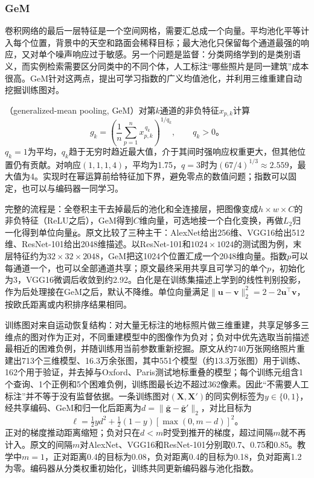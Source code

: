 \subsubsection{GeM}
\label{sec:vision-recognition-gem}

卷积网络的最后一层特征是一个空间网格，需要汇总成一个向量。平均池化平等计入每个位置，背景中的天空和路面会稀释目标；最大池化只保留每个通道最强的响应，又对单个噪声响应过于敏感。另一个问题是监督：分类网络学到的是类别语义，而实例检索需要区分同类中的不同个体，人工标注“哪些照片是同一建筑”成本很高。GeM针对这两点，提出可学习指数的广义均值池化，并利用三维重建自动挖掘训练图对。

（generalized-mean pooling, GeM）对第$k$通道的非负特征$x_{p,k}$计算
\begin{equation}
 g_k=\left(\frac1n\sum_{p=1}^{n}x_{p,k}^{\,q_k}\right)^{1/q_k},
 \qquad q_k>0\text{。}
 \label{eq:vision-gem}
\end{equation}
$q_k=1$为平均，$q_k$趋于无穷时趋近最大值，介于其间时强响应权重更大，但其他位置仍有贡献。对响应$(1,1,1,4)$，平均为1.75，$q=3$时为$(67/4)^{1/3}\approx2.559$，最大值为4。实现时在幂运算前给特征加下界，避免零点的数值问题；指数可以固定，也可以与编码器一同学习。

完整的流程是：全卷积主干去掉最后的池化和全连接层，把图像变成$h\times w\times C$的非负特征（ReLU之后），GeM得到$C$维向量，可选地接一个白化变换，再做$L_2$归一化得到单位向量$\bar{\bm g}$。原文比较了三种主干：AlexNet给出256维、VGG16给出512维、ResNet-101给出2048维描述。以ResNet-101和$1024\times1024$的测试图为例，末层特征约为$32\times32\times2048$，GeM把这1024个位置汇成一个2048维向量。指数$p$可以每通道一个，也可以全部通道共享；原文最终采用共享且可学习的单个$p$，初始化为3，VGG16微调后收敛到约2.92。白化是在训练集描述上学到的线性判别投影，作为后处理接在GeM之后，默认不降维。单位向量满足$\lVert\bm{u}-\bm{v}\rVert_2^2=2-2\bm{u}^{\top}\bm{v}$，按欧氏距离或内积排序结果相同。

训练图对来自运动恢复结构：对大量无标注的地标照片做三维重建，共享足够多三维点的图对作为正对，不同重建模型中的图像作为负对；负对中优先选取当前描述最相近的困难负例，并随训练用当前参数重新挖掘。原文从约740万张网络照片重建出713个三维模型、16.3万余张图，其中551个模型（约13.3万张图）用于训练、162个用于验证，并去掉与Oxford、Paris测试地标重叠的模型；每个训练元组含1个查询、1个正例和5个困难负例，训练图最长边不超过362像素。因此“不需要人工标注”并不等于没有监督依据。一条训练图对$(\bm X,\bm X')$的同实例标签为$y\in\{0,1\}$，经共享编码、GeM和归一化后距离为$d=\lVert\bar{\bm g}-\bar{\bm g}'\rVert_2$，对比目标为
\begin{equation}
 \ell=\tfrac12 y d^2+
 \tfrac12(1-y)[\max(0,m-d)]^2\text{。}
 \label{eq:vision-gem-contrastive-process}
\end{equation}
正对的梯度推动距离缩短；负对只在$d<m$时受到推开的梯度，超过间隔$m$就不再计入。原文的间隔$m$对AlexNet、VGG16和ResNet-101分别取0.7、0.75和0.85。教学中$m=1$，正对距离0.4的目标为0.08，负对距离0.4的目标为0.18，负对距离1.2为零。编码器从分类权重初始化，训练共同更新编码器与池化指数。

